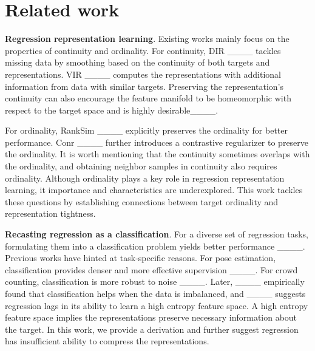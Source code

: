 \section{Related work}
\textbf{Regression representation learning}. 
Existing works mainly focus on the properties of continuity and ordinality. For continuity, DIR ____ tackles missing data by smoothing based on the continuity of both targets and representations.  VIR ____ computes the representations with additional information from data with similar targets. 
Preserving the representation's continuity  can also encourage the feature manifold to be homeomorphic with respect to the target space and is highly desirable____. 

For ordinality, RankSim ____ explicitly preserves the ordinality for better performance. Conr ____ further introduces a contrastive regularizer to preserve the ordinality. It is worth mentioning that the continuity sometimes overlaps with the ordinality, and obtaining neighbor samples in continuity also requires ordinality. Although ordinality plays a key role in regression representation learning, it importance and 
characteristics are underexplored.  
This work tackles these questions by establishing connections between target ordinality and representation tightness.

\textbf{Recasting regression as a classification}. For a diverse set of regression tasks, formulating them into a classification problem yields better performance ____. Previous works have hinted at task-specific reasons. For pose estimation, classification provides denser and more effective supervision ____. For crowd counting, classification is more robust to noise ____. Later, ____ empirically found that classification helps when the data is imbalanced, and ____ suggests regression lags in its ability to learn a high entropy feature space. A high entropy feature space implies the representations preserve necessary information about the target. In this work, we provide a derivation and further suggest regression has insufficient ability to compress the representations.